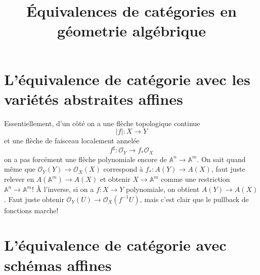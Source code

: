 \documentclass[a4paper,12pt]{book}
\title{Équivalences de catégories en géometrie algébrique}
\date{}
\newcommand{\A}{\mathbb{A}}
\newcommand{\Or}{\mathcal{O}}
\theoremstyle{plain}
\theoremstyle{definition}
\theoremstyle{remark}
\begin{document}
\maketitle
\tableofcontents



\section{L'équivalence de catégorie avec les variétés abstraites affines}
Essentiellement, d'un côté on a une flèche topologique continue 
\[|f|\colon X\to Y\]
et une flèche de faisceau localement annelée
\[f^\sharp\colon \Or_Y\to f_*\Or_X\]
on a pas forcément une flèche polynomiale encore de $\A^n\to \A^m$.
On sait quand même que $\Or_Y(Y)\to \Or_X(X)$ correspond à 
$f_*\colon A(Y)\to A(X)$, faut juste relever en $A(\A^m)\to A(X)$
et obtenir $X\to \A^m$ comme une restriction $\A^n\to \A^m$! À l'inverse,
si on a $f\colon X\to Y$ polynomiale, on obtient $A(Y)\to A(X)$. Faut
juste obtenir $\Or_Y(U)\to \Or_X(f^{-1} U)$, mais c'est clair que le 
pullback de fonctions marche!




\section{L'équivalence de catégorie avec schémas affines}
\end{document}
